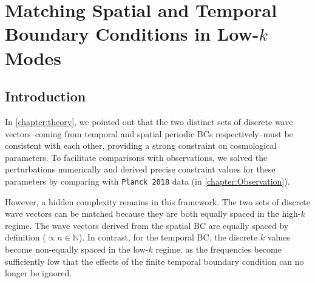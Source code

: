 \chapter{Matching Spatial and Temporal Boundary Conditions in Low-$k$ Modes}\label{chapter:low-k}





\section{Introduction}


In \cref{chapter:theory}, we pointed out that the two distinct sets of discrete wave vectors--coming from temporal and spatial periodic BCs respectively--must be consistent with each other, providing a strong constraint on cosmological parameters. To facilitate comparisons with observations, we solved the perturbations numerically and derived precise constraint values for these parameters by comparing with \texttt{Planck 2018} data (in \cref{chapter:Observation}).

However, a hidden complexity remains in this framework. The two sets of discrete wave vectors can be matched because they are both equally spaced in the high-$k$ regime. The wave vectors derived from the spatial BC are equally spaced by definition ($\propto n\in\mathbb{N}$). In contrast, for the temporal BC, the discrete $k$ values become non-equally spaced in the low-$k$ regime, as the frequencies become sufficiently low that the effects of the finite temporal boundary condition can no longer be ignored. 

